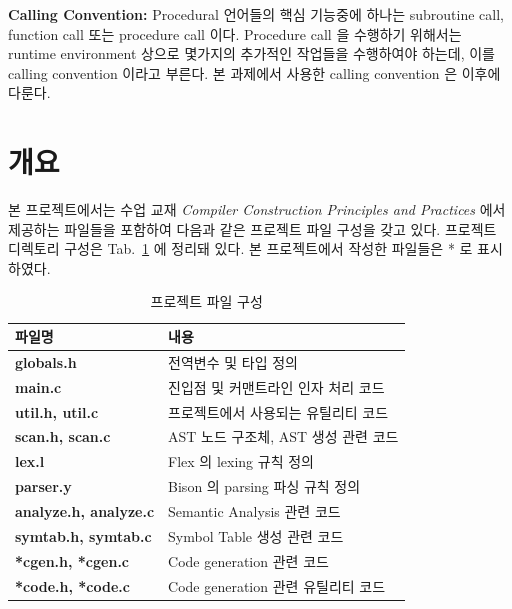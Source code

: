 \documentclass[a4paper,12p]{paper}
\begin{document}
\vspace{0.1in}
\noindent\textbf{Calling Convention:} Procedural 언어들의 핵심 기능중에 하나는 subroutine call, function call 또는 procedure call 이다. Procedure call 을 수행하기 위해서는 runtime environment 상으로 몇가지의 추가적인 작업들을 수행하여야 하는데, 이를 calling convention 이라고 부른다. 본 과제에서 사용한 calling convention 은 이후에 다룬다.


\section{개요}
본 프로젝트에서는 수업 교재 \textit{Compiler Construction Principles and Practices} 에서 제공하는 파일들을 포함하여 다음과 같은 프로젝트 파일 구성을 갖고 있다. 프로젝트 디렉토리 구성은 Tab.~\ref{table:files} 에 정리돼 있다. 본 프로젝트에서 작성한 파일들은 * 로 표시하였다. 

\begin{table}[H]
  \centering
\begin{threeparttable}
  \caption{프로젝트 파일 구성}\label{table:files}
\begin{tabular}{ll}
  \toprule
파일명 &    내용 \\
        \midrule
  \textbf{globals.h}            & 전역변수 및 타입 정의 \\
  \textbf{main.c}               & 진입점 및 커맨트라인 인자 처리 코드 \\
  \textbf{util.h, util.c}       & 프로젝트에서 사용되는 유틸리티 코드 \\
  \textbf{scan.h, scan.c}       & AST 노드 구조체, AST 생성 관련 코드 \\
  \textbf{lex.l}                & Flex 의 lexing 규칙 정의 \\
  \textbf{parser.y}             & Bison 의 parsing 파싱 규칙 정의 \\
  \textbf{analyze.h, analyze.c} & Semantic Analysis 관련 코드 \\
  \textbf{symtab.h, symtab.c}   & Symbol Table 생성 관련 코드 \\
  \textbf{*cgen.h, *cgen.c}     & Code generation 관련 코드 \\
  \textbf{*code.h, *code.c}     & Code generation 관련  유틸리티 코드 \\
 \bottomrule
\end{tabular}
\end{threeparttable}\\
\end{table}
\end{document}
